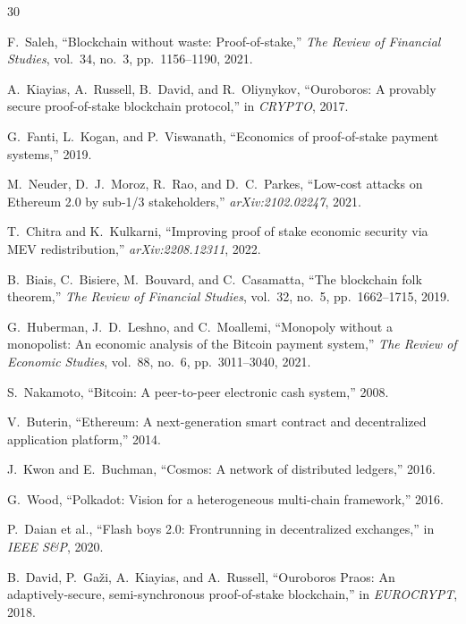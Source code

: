 \documentclass[11pt,a4paper]{article}
\begin{document}

\begin{thebibliography}{30}

F.~Saleh, ``Blockchain without waste: Proof-of-stake,'' \emph{The Review of Financial Studies}, vol.~34, no.~3, pp.~1156--1190, 2021.

A.~Kiayias, A.~Russell, B.~David, and R.~Oliynykov, ``Ouroboros: A provably secure proof-of-stake blockchain protocol,'' in \emph{CRYPTO}, 2017.

G.~Fanti, L.~Kogan, and P.~Viswanath, ``Economics of proof-of-stake payment systems,'' 2019.

M.~Neuder, D.~J.~Moroz, R.~Rao, and D.~C.~Parkes, ``Low-cost attacks on Ethereum 2.0 by sub-1/3 stakeholders,'' \emph{arXiv:2102.02247}, 2021.

T.~Chitra and K.~Kulkarni, ``Improving proof of stake economic security via MEV redistribution,'' \emph{arXiv:2208.12311}, 2022.

B.~Biais, C.~Bisiere, M.~Bouvard, and C.~Casamatta, ``The blockchain folk theorem,'' \emph{The Review of Financial Studies}, vol.~32, no.~5, pp.~1662--1715, 2019.

G.~Huberman, J.~D.~Leshno, and C.~Moallemi, ``Monopoly without a monopolist: An economic analysis of the Bitcoin payment system,'' \emph{The Review of Economic Studies}, vol.~88, no.~6, pp.~3011--3040, 2021.

S.~Nakamoto, ``Bitcoin: A peer-to-peer electronic cash system,'' 2008.

V.~Buterin, ``Ethereum: A next-generation smart contract and decentralized application platform,'' 2014.

J.~Kwon and E.~Buchman, ``Cosmos: A network of distributed ledgers,'' 2016.

G.~Wood, ``Polkadot: Vision for a heterogeneous multi-chain framework,'' 2016.

P.~Daian et al., ``Flash boys 2.0: Frontrunning in decentralized exchanges,'' in \emph{IEEE S\&P}, 2020.

B.~David, P.~Ga\v{z}i, A.~Kiayias, and A.~Russell, ``Ouroboros Praos: An adaptively-secure, semi-synchronous proof-of-stake blockchain,'' in \emph{EUROCRYPT}, 2018.


\end{thebibliography}
\end{document}
